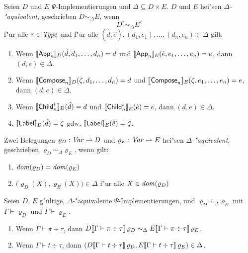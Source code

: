 \documentclass[%
  12pt,%
  a4paper,%
]{article}
\newcommand{\Tj}[3]{{#1}\vdash{#2}\div{#3}}
\begin{document}
\begin{definition} \label{def:Aequivalenz_von_Implementierungen}
  Seien $D$ und $E$ $\Psi$-Implementierungen und $\Delta \subseteq D \times E$. $D$ und $E$ hei"sen
  \emph{$\Delta$-"aquivalent}, geschrieben $D \sim_\Delta E$, wenn \[D^\tau \sim_\Delta E^\tau\] f"ur
  alle $\tau \in \mathit{Type}$ und f"ur alle $(\hat{d},\hat{e}),(d_1,e_1),\ldots,(d_n,e_n) \in \Delta$ gilt:
  \begin{enumerate}
  \item Wenn $[\![\mathsf{App}_n]\!]_D(\hat{d},d_1,\ldots,d_n) = d$ und $[\![\mathsf{App}_n]\!]_E(\hat{e},e_1,\ldots,e_n) = e$,
    dann $(d,e) \in \Delta$.
  \item Wenn $[\![\mathsf{Compose}_n]\!]_D(\zeta,d_1,\ldots,d_n) = d$ und $[\![\mathsf{Compose}_n]\!]_E(\zeta,e_1,\ldots,e_n) = e$,
    dann $(d,e) \in \Delta$.
  \item Wenn $[\![\mathsf{Child}_n^i]\!]_D(\hat{d}) = d$ und $[\![\mathsf{Child}_n^i]\!]_E(\hat{e}) = e$,
    dann $(d,e) \in \Delta$.
  \item $[\![\mathsf{Label}]\!]_D(\hat{d}) = \zeta$ gdw. $[\![\mathsf{Label}]\!]_E(\hat{e}) = \zeta$.
  \end{enumerate}
\end{definition}
Zwei Belegungen $\varrho_D: \mathit{Var} \rightharpoonup D$ und $\varrho_E: \mathit{Var} \rightharpoonup E$ hei"sen \emph{$\Delta$-"aquivalent},
geschrieben $\varrho_D \sim_\Delta \varrho_E$, wenn gilt:
\begin{enumerate}
\item $\mathit{dom}(\varrho_D) = \mathit{dom}(\varrho_E)$
\item $\bigl(\varrho_D(X),\varrho_E(X)\bigr) \in \Delta$ f"ur alle $X \in \mathit{dom}(\varrho_D)$
\end{enumerate}

\begin{lemma}
  Seien $D$, $E$ g"ultige, $\Delta$-"aquivalente $\Psi$-Implementierungen,
  und $\varrho_D \sim_\Delta \varrho_E$ mit $\Gamma \vdash \varrho_D$ und $\Gamma \vdash \varrho_E$.
  \begin{enumerate}
  \item Wenn $\Tj{\Gamma}{\pi}{\tau}$, dann
    $D\sem{\Tj{\Gamma}{\pi}{\tau}}\,\varrho_D \sim_\Delta E\sem{\Tj{\Gamma}{\pi}{\tau}}\,\varrho_E$.
  \item Wenn $\Tj{\Gamma}{t}{\tau}$, dann
    $(D\sem{\Tj{\Gamma}{t}{\tau}}\,\varrho_D,E\sem{\Tj{\Gamma}{t}{\tau}}\,\varrho_E) \in \Delta$.
  \end{enumerate}
\end{lemma}
\end{document}
